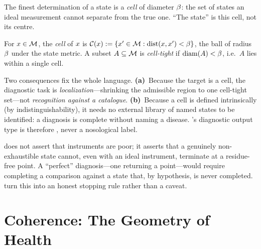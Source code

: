 \begin{corollary}
\label{cfc:cor:cell}
The finest determination of a state is a \emph{cell} of diameter $\beta$: the
set of states an ideal measurement cannot separate from the true one. ``The
state'' is this cell, not its centre.
\end{corollary}

\begin{definition}[Cell]
\label{cfc:def:cell}
For $x\in\mathcal{M}$, the \emph{cell} of $x$ is
$\mathcal{C}(x):=\{x'\in\mathcal{M}:\operatorname{dist}(x,x')<\beta\}$, the ball of radius
$\beta$ under the state metric. A subset $A\subseteq\mathcal{M}$ is \emph{cell-tight}
if $\operatorname{diam}(A)<\beta$, i.e.\ $A$ lies within a single cell.
\end{definition}

\begin{principle}
\label{cfc:prin:goal}
Two consequences fix the whole language. \textbf{(a)}~Because the target is a
cell, the diagnostic task is \emph{localization}---shrinking the admissible
region to one cell-tight set---not \emph{recognition against a catalogue}.
\textbf{(b)}~Because a cell is defined intrinsically (by indistinguishability),
it needs no external library of named states to be identified: a diagnosis is
complete without naming a disease. 's diagnostic output type is
therefore , never a nosological label.
\end{principle}

\begin{remark}
\label{cfc:rem:floor-scope}
 does not assert that instruments are poor; it asserts that a
genuinely non-exhaustible state cannot, even with an ideal instrument,
terminate at a residue-free point. A ``perfect'' diagnosis---one returning a
point---would require completing a comparison against a state that, by
hypothesis, is never completed.  turn this into
an honest stopping rule rather than a caveat.
\end{remark}

\section{Coherence: The Geometry of Health}
\label{cfc:sec:coherence}

